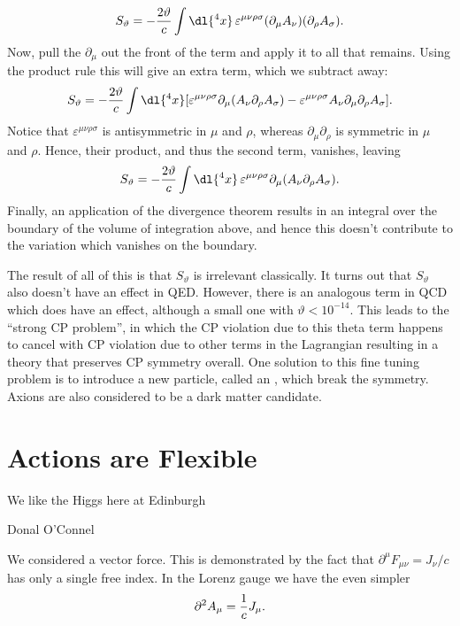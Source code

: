 \begin{equation}
    S_{\vartheta} = -\frac{2\vartheta}{c} \int \dl{^4x} \, \varepsilon^{\mu\nu\rho\sigma} (\partial_\mu A_\nu)(\partial_\rho A_\sigma).
\end{equation}
Now, pull the \(\partial_\mu\) out the front of the term and apply it to all that remains.
Using the product rule this will give an extra term, which we subtract away:
\begin{equation}
    S_{\vartheta} = -\frac{2\vartheta}{c} \int \dl{^4x} [\varepsilon^{\mu\nu\rho\sigma} \partial_\mu(A_\nu \partial_\rho A_\sigma) - \varepsilon^{\mu\nu\rho\sigma}A_\nu \partial_\mu\partial_\rho A_\sigma].
\end{equation}
Notice that \(\varepsilon^{\mu\nu\rho\sigma}\) is antisymmetric in \(\mu\) and \(\rho\), whereas \(\partial_\mu\partial_\rho\) is symmetric in \(\mu\) and \(\rho\).
Hence, their product, and thus the second term, vanishes, leaving
\begin{equation}
    S_{\vartheta} = -\frac{2\vartheta}{c} \int \dl{^4x} \, \varepsilon^{\mu\nu\rho\sigma} \partial_\mu (A_\nu \partial_\rho A_\sigma).
\end{equation}
Finally, an application of the divergence theorem results in an integral over the boundary of the volume of integration above, and hence this doesn't contribute to the variation which vanishes on the boundary.

The result of all of this is that \(S_{\vartheta}\) is irrelevant classically.
It turns out that \(S_{\vartheta}\) also doesn't have an effect in QED.
However, there is an analogous term in QCD which does have an effect, although a small one with \(\vartheta < 10^{-14}\).
This leads to the \enquote{strong CP problem}, in which the CP violation due to this theta term happens to cancel with CP violation due to other terms in the Lagrangian resulting in a theory that preserves CP symmetry overall.
One solution to this fine tuning problem is to introduce a new particle, called an , which break the symmetry.
Axions are also considered to be a dark matter candidate.

\section{Actions are Flexible}
\epigraph{We like the Higgs here at Edinburgh}{Donal O'Connel}
We considered a vector force.
This is demonstrated by the fact that \(\partial^\mu F_{\mu\nu} = J_\nu/c\) has only a single free index.
In the Lorenz gauge we have the even simpler
\begin{equation}
    \partial^2 A_\mu = \frac{1}{c}J_\mu.
\end{equation}

